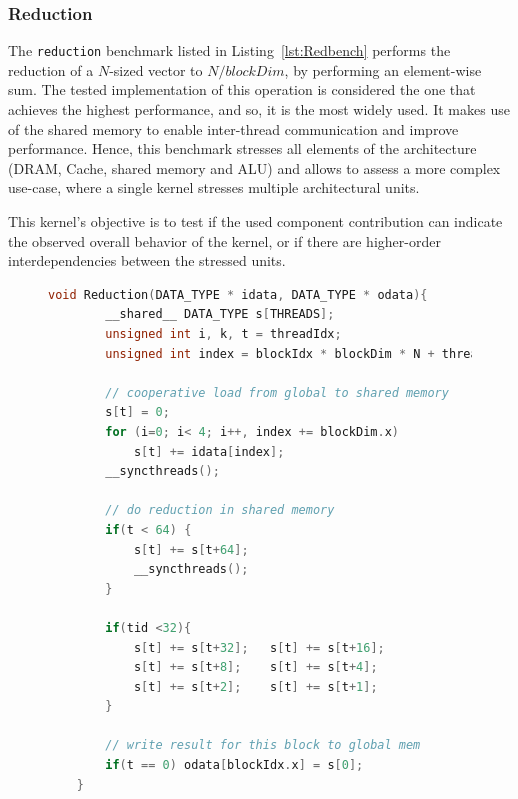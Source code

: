 \subsubsection{Reduction}

The \texttt{reduction} benchmark listed in Listing~\ref{lst:Redbench} performs the reduction of a $N$-sized vector to $N/blockDim$, by performing an element-wise sum. The tested implementation of this operation is considered the one that achieves the highest performance, and so, it is the most widely used. It makes use of the shared memory to enable inter-thread communication and improve performance. Hence, this benchmark stresses all elements of the architecture (DRAM, Cache, shared memory and ALU) and allows to assess a more complex use-case, where a single kernel stresses multiple architectural units.

This kernel's objective is to test if the used component contribution can indicate the observed overall behavior of the kernel, or if there are higher-order interdependencies between the stressed units.

\begin{figure}[htb]
    \begin{lstlisting}[language=C, caption=Reduction Kernel Code, label=lst:Redbench, basicstyle=\footnotesize\ttfamily,abovecaptionskip=0pt, captionpos=b]
    void Reduction(DATA_TYPE * idata, DATA_TYPE * odata){
        __shared__ DATA_TYPE s[THREADS];
        unsigned int i, k, t = threadIdx;
        unsigned int index = blockIdx * blockDim * N + threadIdx;
        
        // cooperative load from global to shared memory
        s[t] = 0;
        for (i=0; i< 4; i++, index += blockDim.x)
            s[t] += idata[index];
        __syncthreads();
        
        // do reduction in shared memory
        if(t < 64) {
            s[t] += s[t+64]; 
            __syncthreads(); 
        }
        
        if(tid <32){
            s[t] += s[t+32];   s[t] += s[t+16];
            s[t] += s[t+8];    s[t] += s[t+4];
            s[t] += s[t+2];    s[t] += s[t+1];
        }
        
        // write result for this block to global mem
        if(t == 0) odata[blockIdx.x] = s[0];
    }
    \end{lstlisting}
\end{figure}

\newpage
